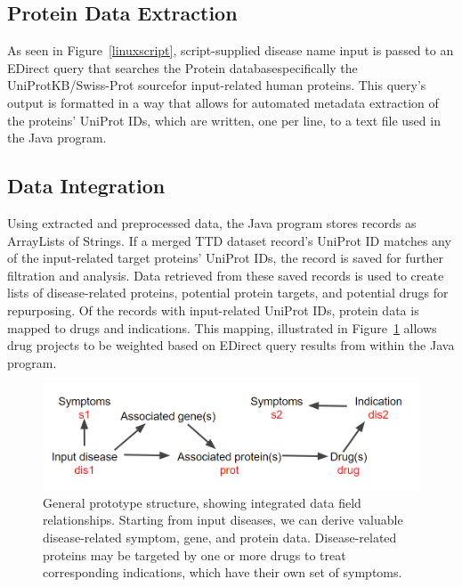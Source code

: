 \documentclass{IEEEtran}
\begin{document}
   
	\subsection{Protein Data Extraction}
	As seen in Figure~\ref{linuxscript}, script-supplied disease name input is passed to an EDirect query that searches the Protein database\textemdash specifically the UniProtKB/Swiss-Prot source\textemdash for input-related human proteins.  This query's output is formatted in a way that allows for automated metadata extraction of the proteins' UniProt IDs, which are written, one per line, to a text file used in the Java program.
	\subsection{Data Integration}
	Using extracted and preprocessed data, the Java program stores records as ArrayLists of Strings.  If a merged TTD dataset record's UniProt ID matches any of the input-related target proteins' UniProt IDs, the record is saved for further filtration and analysis.  Data retrieved from these saved records is used to create lists of disease-related proteins, potential protein targets, and potential drugs for repurposing.  Of the records with input-related UniProt IDs, protein data is mapped to drugs and indications.  This mapping, illustrated in Figure~\ref{prototypestructure} allows drug projects to be weighted based on EDirect query results from within the Java program.
		\begin{figure}[h]
			\centering
			\includegraphics[width=\linewidth]{prototypestructure}
			\caption{\footnotesize General prototype structure, showing integrated data field relationships.  Starting from input diseases, we can derive valuable disease-related symptom, gene, and protein data.  Disease-related proteins may be targeted by one or more drugs to treat corresponding indications, which have their own set of symptoms.}
			\label{prototypestructure}
		\end{figure}
\end{document}
